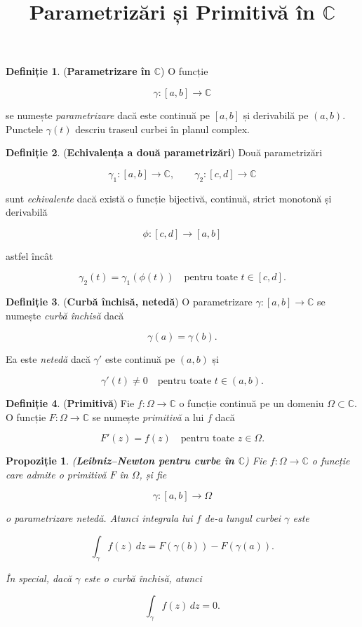\documentclass[12pt]{article}
\title{Parametrizări și Primitivă în $\mathbb{C}$}
\author{}
\date{}
\theoremstyle{definition}
\newtheorem{definition}{Definiție}
\theoremstyle{plain}
\newtheorem{proposition}{Propoziție}
\begin{document}
\maketitle

\begin{definition}
(\textbf{Parametrizare în $\mathbb{C}$})  
O funcție 


\[
\gamma : [a,b] \to \mathbb{C}
\]


se numește \emph{parametrizare} dacă este continuă pe $[a,b]$ și derivabilă pe $(a,b)$.  
Punctele $\gamma(t)$ descriu traseul curbei în planul complex.
\end{definition}

\begin{definition}
(\textbf{Echivalența a două parametrizări})  
Două parametrizări 


\[
\gamma_1 : [a,b] \to \mathbb{C}, \qquad 
\gamma_2 : [c,d] \to \mathbb{C}
\]


sunt \emph{echivalente} dacă există o funcție bijectivă, continuă, strict monotonă și derivabilă


\[
\phi : [c,d] \to [a,b]
\]


astfel încât


\[
\gamma_2(t) = \gamma_1(\phi(t)) \quad \text{pentru toate } t \in [c,d].
\]


\end{definition}

\begin{definition}
(\textbf{Curbă închisă, netedă})  
O parametrizare $\gamma : [a,b] \to \mathbb{C}$ se numește \emph{curbă închisă} dacă


\[
\gamma(a) = \gamma(b).
\]


Ea este \emph{netedă} dacă $\gamma'$ este continuă pe $(a,b)$ și


\[
\gamma'(t) \neq 0 \quad \text{pentru toate } t \in (a,b).
\]


\end{definition}

\begin{definition}
(\textbf{Primitivă})  
Fie $f:\Omega \to \mathbb{C}$ o funcție continuă pe un domeniu $\Omega \subset \mathbb{C}$.  
O funcție $F:\Omega \to \mathbb{C}$ se numește \emph{primitivă} a lui $f$ dacă


\[
F'(z) = f(z) \quad \text{pentru toate } z \in \Omega.
\]


\end{definition}

\begin{proposition}
(\textbf{Leibniz–Newton pentru curbe în $\mathbb{C}$})  
Fie $f:\Omega \to \mathbb{C}$ o funcție care admite o primitivă $F$ în $\Omega$, și fie


\[
\gamma : [a,b] \to \Omega
\]


o parametrizare netedă.  
Atunci integrala lui $f$ de-a lungul curbei $\gamma$ este


\[
\int_{\gamma} f(z)\,dz = F(\gamma(b)) - F(\gamma(a)).
\]


În special, dacă $\gamma$ este o curbă închisă, atunci


\[
\int_{\gamma} f(z)\,dz = 0.
\]


\end{proposition}
\end{document}

